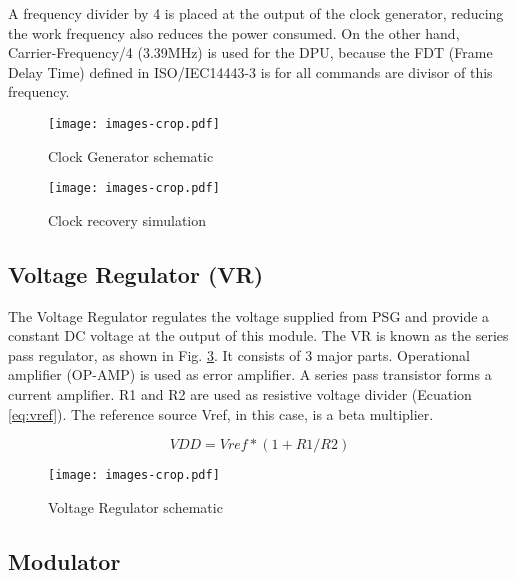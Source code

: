 A frequency divider by 4 is placed at the output of the clock generator, reducing the work frequency also reduces the power consumed. On the other hand, Carrier-Frequency/4 (3.39MHz) is used for the DPU, because the FDT (Frame Delay Time)  defined in ISO/IEC14443-3 is for all commands are divisor of this frequency.
 

\begin{figure}[]
  \centering
  \texttt{[image: images-crop.pdf]}
  \caption{Clock Generator schematic}
  \label{fig:clk}
\end{figure}

\begin{figure}[]
  \centering
  \texttt{[image: images-crop.pdf]}
  \caption{Clock recovery simulation}
  \label{fig:clk_sim}
\end{figure}

\subsection{Voltage Regulator (VR)}

The Voltage Regulator regulates the voltage supplied from PSG and provide a constant DC voltage at the output of this module. The VR is known as the series pass regulator, as shown in Fig. \ref{fig:ldo}. It consists of 3 major parts. Operational amplifier (OP-AMP) is used as error amplifier. A series pass transistor forms a current amplifier. R1 and R2 are used as resistive voltage divider (Ecuation \ref{eq:vref}). The reference source Vref, in this case, is a beta multiplier. 

\begin{equation} \label{eq:vref}
VDD = Vref*(1+R1/R2)
\end{equation}


\begin{figure}[]
  \centering
  \texttt{[image: images-crop.pdf]}
  \caption{Voltage Regulator schematic}
  \label{fig:ldo}
\end{figure}

\subsection{Modulator}

